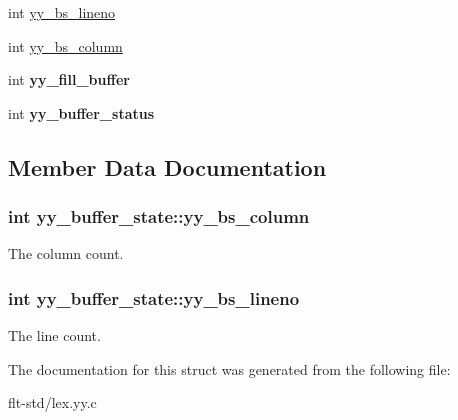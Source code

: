 \begin{DoxyCompactItemize}
\item 
int \hyperlink{structyy__buffer__state_a818e94bc9c766e683c60df1e9fd01199}{yy\+\_\+bs\+\_\+lineno}
\item 
int \hyperlink{structyy__buffer__state_a10c4fcd8be759e6bf11e6d3e8cdb0307}{yy\+\_\+bs\+\_\+column}
\item 
\hypertarget{structyy__buffer__state_a63d2afbb1d79a3fc63df9e12626f827d}{}int {\bfseries yy\+\_\+fill\+\_\+buffer}\label{structyy__buffer__state_a63d2afbb1d79a3fc63df9e12626f827d}

\item 
\hypertarget{structyy__buffer__state_a70fd925d37a2f0454fbd0def675d106c}{}int {\bfseries yy\+\_\+buffer\+\_\+status}\label{structyy__buffer__state_a70fd925d37a2f0454fbd0def675d106c}

\end{DoxyCompactItemize}


\subsection{Member Data Documentation}
\hypertarget{structyy__buffer__state_a10c4fcd8be759e6bf11e6d3e8cdb0307}{}
\subsubsection[{yy\+\_\+bs\+\_\+column}]{\setlength{\rightskip}{0pt plus 5cm}int yy\+\_\+buffer\+\_\+state\+::yy\+\_\+bs\+\_\+column}\label{structyy__buffer__state_a10c4fcd8be759e6bf11e6d3e8cdb0307}
The column count. \hypertarget{structyy__buffer__state_a818e94bc9c766e683c60df1e9fd01199}{}
\subsubsection[{yy\+\_\+bs\+\_\+lineno}]{\setlength{\rightskip}{0pt plus 5cm}int yy\+\_\+buffer\+\_\+state\+::yy\+\_\+bs\+\_\+lineno}\label{structyy__buffer__state_a818e94bc9c766e683c60df1e9fd01199}
The line count. 

The documentation for this struct was generated from the following file\+:\begin{DoxyCompactItemize}
\item 
flt-\/std/lex.\+yy.\+c\end{DoxyCompactItemize}
